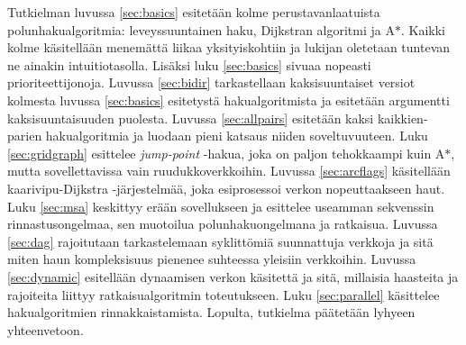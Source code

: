 \documentclass[finnish]{tktltiki2}
\theoremstyle{definition}
\theoremstyle{remark}
\begin{document}
Tutkielman luvussa \ref{sec:basics} esitetään kolme perustavanlaatuista polunhakualgoritmia: leveyssuuntainen haku, Dijkstran algoritmi ja A$\ast$. Kaikki kolme käsitellään menemättä liikaa yksityiskohtiin ja lukijan oletetaan tuntevan ne ainakin intuitiotasolla. Lisäksi luku \ref{sec:basics} sivuaa nopeasti prioriteettijonoja. Luvussa \ref{sec:bidir} tarkastellaan kaksisuuntaiset versiot kolmesta luvussa \ref{sec:basics} esitetystä hakualgoritmista ja esitetään argumentti kaksisuuntaisuuden puolesta. Luvussa \ref{sec:allpairs} esitetään kaksi kaikkien-parien hakualgoritmia ja luodaan pieni katsaus niiden soveltuvuuteen. Luku \ref{sec:gridgraph} esittelee \textit{jump-point} -hakua, joka on paljon tehokkaampi kuin A$\ast$, mutta sovellettavissa vain ruudukkoverkkoihin. Luvussa \ref{sec:arcflags} käsitellään kaarivipu-Dijkstra -järjestelmää, joka esiprosessoi verkon nopeuttaakseen haut. Luku \ref{sec:msa} keskittyy erään sovellukseen ja esittelee useamman sekvenssin rinnastusongelmaa, sen muotoilua polunhakuongelmana ja ratkaisua. Luvussa \ref{sec:dag} rajoitutaan tarkastelemaan syklittömiä suunnattuja verkkoja ja sitä miten haun kompleksisuus pienenee suhteessa yleisiin verkkoihin. Luvussa \ref{sec:dynamic} esitellään dynaamisen verkon käsitettä ja sitä, millaisia haasteita ja rajoiteita liittyy ratkaisualgoritmin toteutukseen. Luku \ref{sec:parallel} käsittelee hakualgoritmien rinnakkaistamista. Lopulta, tutkielma päätetään lyhyeen yhteenvetoon.

%
%
% 
%
\end{document}

